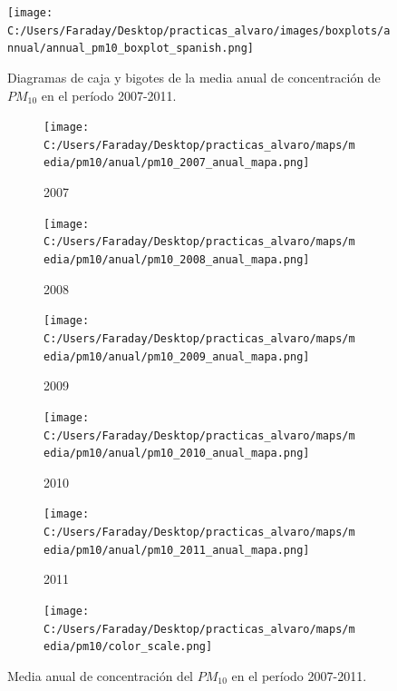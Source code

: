 \documentclass[12pt]{beamer}
\begin{document}
\begin{frame}[squeeze]
\begin{figure}[H]
\centering
\texttt{[image: C:/Users/Faraday/Desktop/practicas\_alvaro/images/boxplots/annual/annual\_pm10\_boxplot\_spanish.png]}
\caption{\scriptsize Diagramas de caja y bigotes de la media anual de concentración de $PM_{10}$ en el período 2007-2011.}
\label{fig:box_pm10_annual}
\end{figure}

\begin{figure}[H]

\centering
\begin{subfigure}[H]{0.18\textwidth}
\texttt{[image: C:/Users/Faraday/Desktop/practicas\_alvaro/maps/media/pm10/anual/pm10\_2007\_anual\_mapa.png]}
\captionsetup{labelformat=empty}
\caption{\scriptsize 2007}
\end{subfigure}
%
\begin{subfigure}[H]{0.18\textwidth}
\texttt{[image: C:/Users/Faraday/Desktop/practicas\_alvaro/maps/media/pm10/anual/pm10\_2008\_anual\_mapa.png]}
\captionsetup{labelformat=empty}
\caption{\scriptsize 2008}
\end{subfigure}
%
\begin{subfigure}[H]{0.18\textwidth}
\texttt{[image: C:/Users/Faraday/Desktop/practicas\_alvaro/maps/media/pm10/anual/pm10\_2009\_anual\_mapa.png]}
\captionsetup{labelformat=empty}
\caption{\scriptsize 2009}
\end{subfigure}
%
\begin{subfigure}[H]{0.18\textwidth}
\texttt{[image: C:/Users/Faraday/Desktop/practicas\_alvaro/maps/media/pm10/anual/pm10\_2010\_anual\_mapa.png]}
\captionsetup{labelformat=empty}
\caption{\scriptsize 2010}
\end{subfigure}
%
\begin{subfigure}[H]{0.18\textwidth}
\texttt{[image: C:/Users/Faraday/Desktop/practicas\_alvaro/maps/media/pm10/anual/pm10\_2011\_anual\_mapa.png]}
\captionsetup{labelformat=empty}
\caption{\scriptsize 2011}
\end{subfigure}

\begin{subfigure}[H]{0.45\textwidth}
\texttt{[image: C:/Users/Faraday/Desktop/practicas\_alvaro/maps/media/pm10/color\_scale.png]}
\captionsetup{labelformat=empty}
\caption{}
\end{subfigure}

\vspace*{-7mm}
\caption{\scriptsize Media anual de concentración del $PM_{10}$ en el período 2007-2011.}
\label{fig:map-pm10-anual}
\end{figure}
\end{frame}
\end{document}
